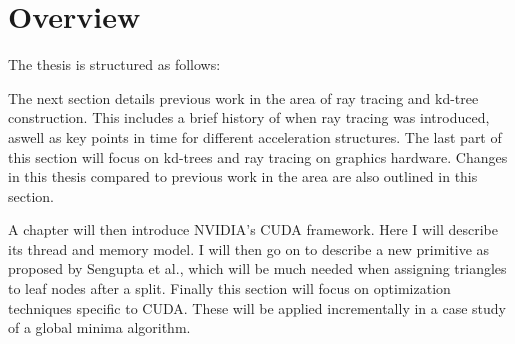 


\section{Overview}

The thesis is structured as follows:


The next section details previous work in the area of ray tracing and
kd-tree construction. This includes a brief history of when ray
tracing was introduced, aswell as key points in time for different
acceleration structures. The last part of this section will focus on
kd-trees and ray tracing on graphics hardware. Changes in this thesis
compared to previous work in the area are also outlined in this
section.


A chapter will then introduce NVIDIA's CUDA framework. Here I will
describe its thread and memory model. I will then go on to describe a
new primitive as proposed by Sengupta et al.,
which will be much needed when assigning triangles to leaf nodes after
a split. Finally this section will focus on optimization techniques
specific to CUDA. These will be applied incrementally in a case study
of a global minima algorithm.


